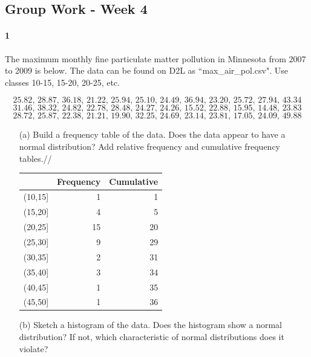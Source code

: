 \documentclass{article}
\begin{document}
\begin{flushleft}
\section*{Group Work - Week 4}
\paragraph{1} The maximum monthly fine particulate matter pollution in Minnesota from 2007 to 2009 is below. The data can be found on D2L as ``max\_air\_pol.csv". Use classes 10-15, 15-20, 20-25, etc. 

\[  25.82 ,\,  28.87 ,\, 36.18 ,\, 21.22 ,\, 25.94 ,\, 25.10 ,\, 24.49 ,\, 36.94 ,\, 23.20 ,\, 25.72 ,\, 27.94 ,\, 43.34 \] 
\[31.46 ,\, 38.32 ,\, 24.82 ,\, 22.78 ,\, 28.48 ,\, 24.27 ,\, 24.26 ,\, 15.52 ,\, 22.88 ,\, 15.95 ,\, 14.48 ,\, 23.83 \]
\[ 28.72 ,\, 25.87 ,\, 22.38 ,\, 21.21 ,\, 19.90 ,\, 32.25 ,\, 24.69 ,\, 23.14 ,\, 23.81 ,\, 17.05 ,\, 24.09 ,\, 49.88 \]
\begin{itemize}
\item [(a)] Build a frequency table of the data. Does the data appear to have a normal distribution? Add relative frequency and cumulative frequency tables.//
\bigskip
{}\\
\bigskip

{\centering
\begin{table}[ht]
\centering
\begin{tabular}{rrr}
\hline
& Frequency & Cumulative \\
\hline
(10,15] &
1 &
1 \\
(15,20] &
4 &
5 \\
(20,25] & 15 & 20 \\
(25,30] &
9 & 29 \\
(30,35] &
2 & 31 \\
(35,40] &
3 & 34 \\
(40,45] &
1 & 35 \\
(45,50] &
1 & 36 \\
\hline
\end{tabular}
\end{table}\par}


\vspace{.5in}
\item[(b)] Sketch a histogram of the data. Does the histogram show a normal distribution? If not, which characteristic of normal distributions does it violate?\\
\bigskip
{}
\bigskip


\end{itemize}
\end{flushleft}
\end{document}
